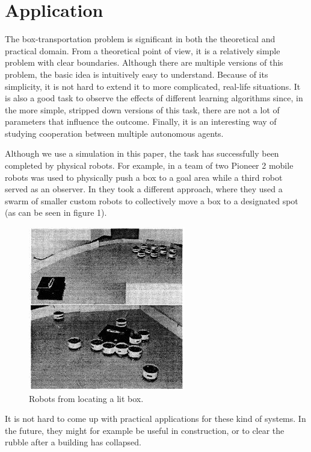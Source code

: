 \section{Application}
The box-transportation problem is significant in both the theoretical and practical domain. From a theoretical point of view, it is a relatively simple problem with clear boundaries. Although there are multiple versions of this problem, the basic idea is intuitively easy to understand. Because of its simplicity, it is not hard to extend it to more complicated, real-life situations. It is also a good task to observe the effects of different learning algorithms since, in the more simple, stripped down versions of this task, there are not a lot of parameters that influence the outcome. Finally, it is an interesting way of studying cooperation between multiple autonomous agents.

 Although we use a simulation in this paper, the task has successfully been completed by physical robots. For example, in \cite{mataric2002} a team of two Pioneer 2 mobile robots was used to physically push a box to a goal area while a third robot served as an observer. In \cite{kube1996} they took a different approach, where they used a swarm of smaller custom robots to collectively move a box to a designated spot (as can be seen in figure 1).
\begin{figure}
	\centering
	\includegraphics{images/swarmPushing.png}
	\caption{Robots from \cite{kube1996} locating a lit box.}
	\label{fig:robots}
\end{figure}
It is not hard to come up with practical applications for these kind of systems. In the future, they might for example be useful in construction, or to clear the rubble after a building has collapsed.\\
